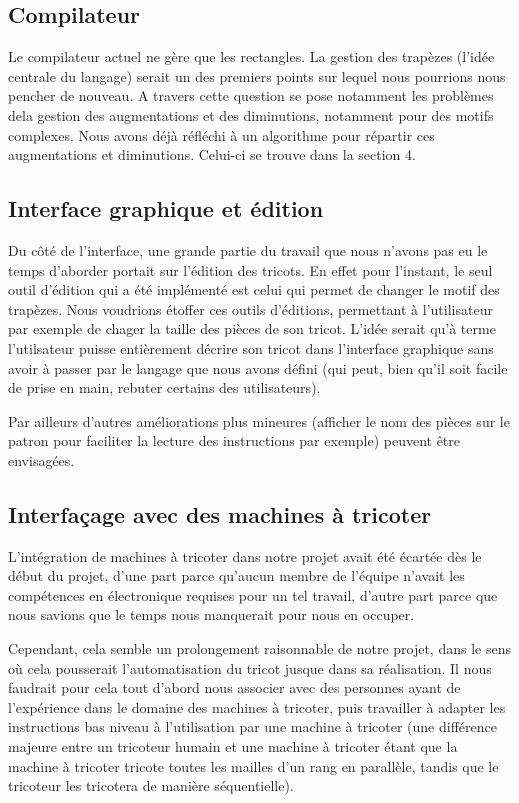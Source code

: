 \documentclass{article}
\begin{document}
\subsection{Compilateur}

Le compilateur actuel ne gère que les rectangles. La gestion des trapèzes 
(l'idée centrale du langage) serait un des premiers points sur lequel nous
pourrions nous pencher de nouveau. A travers cette question se pose notamment
les problèmes dela gestion des augmentations et des diminutions, notamment pour
des motifs complexes. Nous avons déjà réfléchi à un algorithme pour répartir ces 
augmentations et diminutions. Celui-ci se trouve dans la section 4.

\subsection{Interface graphique et édition}

Du côté de l'interface, une grande partie du travail que nous n'avons
pas eu le temps d'aborder portait sur l'édition des tricots. 
En effet pour l'instant, le seul outil d'édition qui a été implémenté est celui qui permet de changer le motif des trapèzes. Nous voudrions étoffer ces outils d'éditions, permettant à l'utilisateur par exemple de chager la taille des pièces de son tricot. L'idée serait qu'à terme l'utilsateur puisse entièrement décrire son tricot dans l'interface graphique sans avoir à passer par le langage que nous avons défini (qui peut, bien qu'il soit facile de prise en main, rebuter certains des utilisateurs).

Par ailleurs d'autres améliorations plus mineures (afficher le nom des pièces sur le patron pour faciliter la lecture des instructions par exemple) peuvent être envisagées.

\subsection{Interfaçage avec des machines à tricoter}

L'intégration de machines à tricoter dans notre projet avait été écartée dès le 
début du projet, d'une part parce qu'aucun membre de l'équipe n'avait les compétences 
en électronique requises pour un tel travail, d'autre part parce que nous savions que 
le temps nous manquerait pour nous en occuper.

Cependant, cela semble un prolongement raisonnable de notre projet, dans le sens où 
cela pousserait l'automatisation du tricot jusque dans sa réalisation. Il nous faudrait 
pour cela tout d'abord nous associer avec des personnes ayant de l'expérience dans le 
domaine des machines à tricoter, puis travailler à adapter les instructions bas niveau 
à l'utilisation par une machine à tricoter (une différence majeure entre un tricoteur 
humain et une machine à tricoter étant que la machine à tricoter tricote toutes les 
mailles d'un rang en parallèle, tandis que le tricoteur les tricotera de manière séquentielle).
\end{document}
